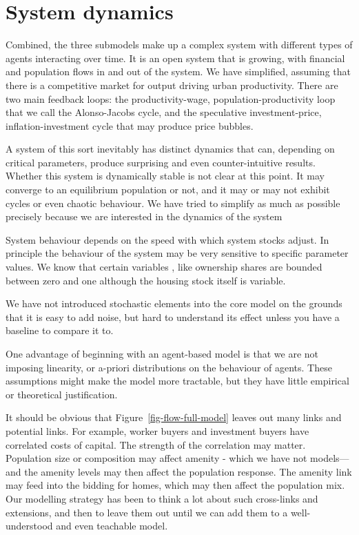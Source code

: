 {\color{red}


\section{System dynamics}\label{sec_model_dynamics}
Combined, the three submodels %
make up a complex system with different types of agents interacting over time. It is an \gls{open system} that is growing, with financial and population flows in and out of the system. We have simplified, assuming that there is a competitive market for output driving urban productivity. There are two main \glspl{feedback loop}: the productivity-wage, population-productivity loop that we call the Alonso-Jacobs cycle, and the speculative investment-price, inflation-investment cycle that may produce price bubbles. 

A system of this sort inevitably has distinct dynamics that can, depending on \glspl{critical parameter}, produce surprising and even counter-intuitive results.  Whether this system is dynamically stable is not clear at this point. It may converge to an equilibrium population or not, and it may or may not exhibit cycles or even chaotic behaviour. We have tried to simplify as much as possible precisely because we are interested in the dynamics of the system

System behaviour depends on the speed with which system stocks adjust. In principle the behaviour of the system may be very sensitive to specific parameter values. We know that certain variables , like ownership  shares are bounded between zero and one although the housing stock itself is variable.  

We have not introduced  stochastic elements into the core model on the grounds that it is easy to add noise, but hard to understand its effect unless you have a baseline to  compare it to.

One advantage of beginning with an agent-based model is that we are not imposing linearity, or a-priori distributions on the behaviour of agents. These assumptions might make the model more tractable, but they have little empirical or theoretical justification.

It should be obvious that Figure~\ref{fig-flow-full-model} leaves out many links and potential links. For example, worker buyers and investment buyers have correlated costs of capital. The strength of the correlation may matter. Population size or composition may affect amenity - which we have not models---and the amenity levels may then affect the population response. The amenity link may feed into the bidding for homes, which may then affect the population mix. Our modelling strategy has been to think a lot about such cross-links and extensions, and then to leave them out until we can add them to a well-understood and even teachable model.
}


